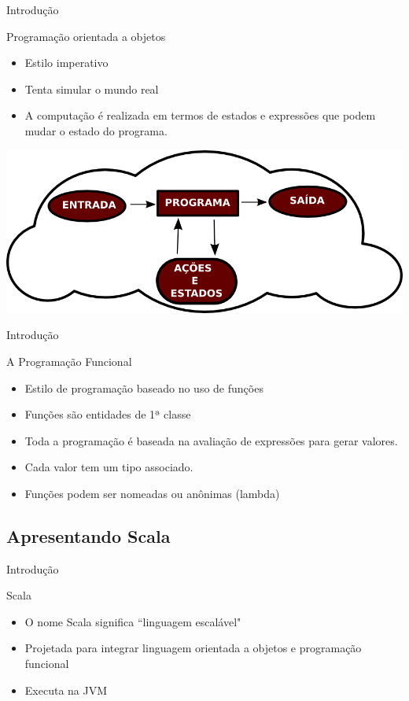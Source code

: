 \begin{frame}{Introdução}
	\begin{block}{Programação orientada a objetos}
		\begin{itemize}
			\item Estilo imperativo 
			\item Tenta simular o mundo real
			\item A computação é realizada em termos de estados e expressões que podem
			mudar o estado do programa.
		\end{itemize}
	\end{block}
	\begin{center}
		\includegraphics[scale=0.3]{progImp.png}
	\end{center}
\end{frame}

\begin{frame}{Introdução}
	\begin{block}{A Programação Funcional}
		\begin{itemize}
			\item Estilo de programação baseado no uso de funções
			\item Funções são entidades de 1ª classe 
			\item Toda a programação é baseada na avaliação de expressões para gerar valores. 
			\item Cada valor tem um tipo associado.
			\item Funções podem ser nomeadas ou anônimas (lambda)
		\end{itemize}
	\end{block}
\end{frame}

\subsection{Apresentando Scala}
\begin{frame}{Introdução}
	\begin{block}{Scala}
        \begin{itemize}
            \item O nome Scala significa ``linguagem escalável"
            \item Projetada para integrar linguagem orientada a objetos e programação funcional
            \item Executa na JVM
        \end{itemize}
	\end{block}
\end{frame}

